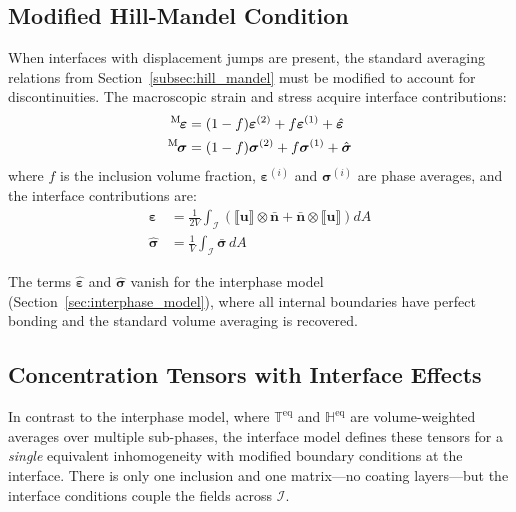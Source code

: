 \documentclass[oneside, 12pt, a4paper, bibliography=totoc]{book}
\newcommand{\jump}[1]{\llbracket #1 \rrbracket}    %
\newcommand{\bs}[1]{\bm{#1}}                       %
\begin{document}
\subsection{Modified Hill-Mandel Condition}
\label{subsec:modified_averaging}
\label{sec:homogenization_interfaces}

When interfaces with displacement jumps are present, the standard averaging relations from Section~\ref{subsec:hill_mandel} must be modified to account for discontinuities. The macroscopic strain and stress acquire interface contributions:
%
\begin{align}
    {}^{\mathrm{M}}\hspace{-1pt}\bs{\varepsilon} &= (1-f)\bs{\varepsilon}^{(2)} + f\bs{\varepsilon}^{(1)} + \hat{\bs{\varepsilon}} \label{eq:macro_strain}\\
    {}^{\mathrm{M}}\hspace{-1pt}\bs{\sigma} &= (1-f)\bs{\sigma}^{(2)} + f\bs{\sigma}^{(1)} + \hat{\bs{\sigma}} \label{eq:macro_stress}
\end{align}
%
where $f$ is the inclusion volume fraction, $\bs{\varepsilon}^{(i)}$ and $\bs{\sigma}^{(i)}$ are phase averages, and the interface contributions are:
%
\begin{align}
    \hat{\bs{\varepsilon}} &= \frac{1}{2V}\int_{\mathcal{I}}\left(\jump{\bs{u}} \otimes \bar{\bs{n}} + \bar{\bs{n}} \otimes \jump{\bs{u}}\right) dA \label{eq:interface_strain_contrib}\\
    \hat{\bs{\sigma}} &= \frac{1}{V}\int_{\mathcal{I}} \bar{\bs{\sigma}} \, dA \label{eq:interface_stress_contrib}
\end{align}

The terms $\hat{\bs{\varepsilon}}$ and $\hat{\bs{\sigma}}$ vanish for the interphase model (Section~\ref{sec:interphase_model}), where all internal boundaries have perfect bonding and the standard volume averaging is recovered.

\subsection{Concentration Tensors with Interface Effects}
\label{subsec:interface_concentration_tensors}

In contrast to the interphase model, where $\mathbb{T}^{\text{eq}}$ and $\mathbb{H}^{\text{eq}}$ are volume-weighted averages over multiple sub-phases, the interface model defines these tensors for a \textit{single} equivalent inhomogeneity with modified boundary conditions at the interface. There is only one inclusion and one matrix---no coating layers---but the interface conditions couple the fields across $\mathcal{I}$.
\end{document}
